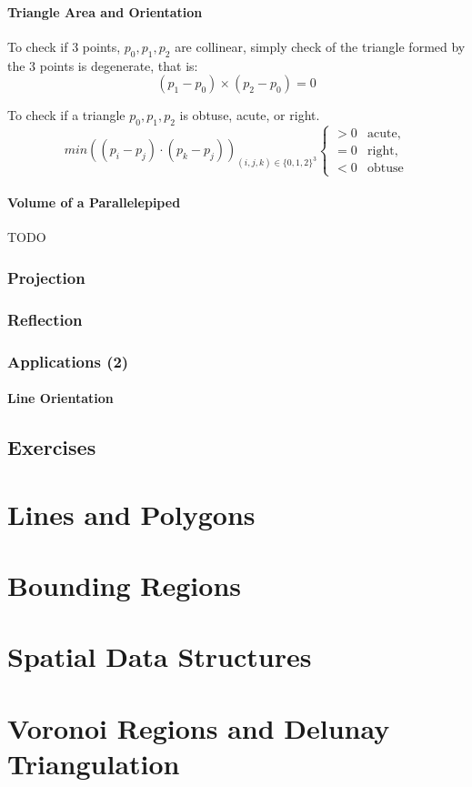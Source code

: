 \documentclass[12pt]{report}
\begin{document}
	\subsubsection{Triangle Area and Orientation}
	
	To check if 3 points, ${p_0, p_1, p_2}$ are collinear, simply check of the triangle formed by the 3 points is degenerate, that is:
	$$
	(p_1-p_0)\times (p_2-p_0) = 0
	$$
	
	To check if a triangle ${p_0, p_1, p_2}$ is obtuse, acute, or right.
	$$
	min((p_i - p_j) \cdot (p_k - p_j))_{ (i,j,k) \in \{0,1,2\}^3}
	\begin{cases}
            > 0 &\text{acute},\\
            = 0 & \text{right}, \\
            < 0 & \text{obtuse}
        \end{cases}
	$$
	
	\subsubsection{Volume of a Parallelepiped}
	TODO
\subsection{Projection}
\subsection{Reflection}
\subsection{Applications (2)}
	\subsubsection{Line Orientation}
\section{Exercises}

\chapter{Lines and Polygons}
\chapter{Bounding Regions}
\chapter{Spatial Data Structures}
\chapter{Voronoi Regions and Delunay Triangulation}
\end{document}
